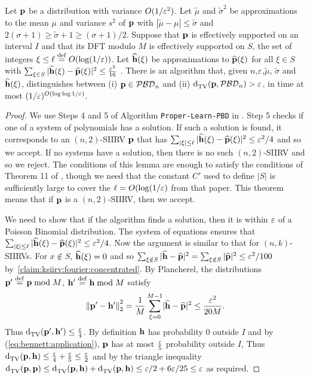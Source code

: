 \begin{lemma}
    Let $\p$ be a distribution with variance $O(1/\eps^2)$. Let $\widetilde \mu$ and $\widetilde{\sigma}^2$ be approximations to the mean $\mu$ and variance $s^2$ of $\p$ with $|\widetilde{\mu}-\mu| \leq \widetilde{\sigma}$ and $2(\sigma+1) \geq \widetilde{\sigma}+1 \geq (\sigma+1)/2$. 
Suppose that $\p$ is effectively supported on an interval $I$ and that its DFT modulo $M$ is effectively supported on $S$, the set of integers  $\xi \leq \ell\eqdef O(\log(1/\eps))$.
Let  $\fourier{\h}(\xi)$ be approximations to $\fourier{\p}(\xi)$ for all $\xi \in S$ with $\sum_{\xi \in S} |\fourier{\h}(\xi) - \fourier{\p}(\xi)|^2 \leq \frac{\eps^2}{16}$ .
 There is an algorithm that, given $n$,$\eps$,$\widetilde{\mu}$, $\widetilde{\sigma}$ and $\fourier{\h}(\xi)$, distinguishes between (i) $\p\in\classpbd[n]$ and (ii) $ \totalvardist{\p}{\classpbd[n]}>\eps$, in time at most $(1/\eps)^{O(\log \log 1/\eps)}$.
 \end{lemma}
 \begin{proof}
We use Steps 4 and 5 of Algorithm \texttt{Proper-Learn-PBD} in \cite{DKS:15b}. Step 5 checks if one of a system of polynomials has a solution. If such a solution is found, it corresponds to an $(n,2)$-SIIRV $\q$ that has $\sum_{|\xi| \leq \ell} |\fourier{\h}(\xi) - \fourier{\q}(\xi)|^2 \leq \eps^2/4$ and so we accept. If no systems have a solution, then there is no such $(n,2)$-SIIRV and so we reject. The conditions of this lemma are enough to satisfy the conditions of Theorem 11 of \cite{DKS:15b}, though we need that the constant $C'$ used to define $|S|$ is sufficiently large to cover the $\ell=O(\log(1/\eps)$ from that paper. This theorem means that if $\p$ is a $(n,2)$-SIIRV, then we accept.

We need to show that if the algorithm finds a solution, then it is within $\eps$ of a Poisson Binomial distribution.  The system of equations ensures that $\sum_{|\xi| \leq \ell} |\fourier{\h}(\xi) - \fourier{\q}(\xi)|^2 \leq \eps^2/4$. Now the argument is similar to that for $(n,k)$-SIIRVs.
For $x \notin S$, $\fourier{\h}(\xi)=0$ and so $\sum_{\xi \notin S} |\fourier{\h}-\fourier{\q}|^2 = \sum_{\xi \notin S} |\fourier{\q}|^2 \leq \eps^2/100$ by~\cref{claim:ksiirv:fourier:concentrated}. By Plancherel, the distributions $\q'\eqdef \q \bmod M$, $\h'\eqdef \h \bmod M$ satisfy 
\[
  \normtwo{ \q'-\h'}^2 = \frac{1}{M}\sum_{\xi=0}^{M-1} \dabs{ \fourier{\h}-\fourier{\q} }^2 \leq \frac{\eps^2}{20M}.
\] Thus $\totalvardist{\q'}{\h'} \leq \frac{\eps}{4}$. By definition $\h$ has probability $0$ outside $I$ and by (\ref{eq:bennett:application}), $\q$ has at most $\frac{\eps}{5}$ probability outside $I$, Thus $\totalvardist{\q}{\h} \leq \frac{\eps}{4}+\frac{\eps}{5} \leq \frac{\eps}{2}$ and by the triangle inequality $ \totalvardist{\p}{\q} \leq \totalvardist{\q}{\h} +  \totalvardist{\p}{\h} \leq \eps/2 + 6\eps/25 \leq \eps$ as required.
 \end{proof}
 
